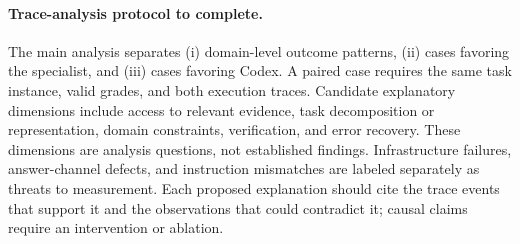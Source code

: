 \paragraph{Trace-analysis protocol to complete.}
The main analysis separates (i) domain-level outcome patterns, (ii) cases favoring the
specialist, and (iii) cases favoring Codex. A paired case requires the same task instance,
valid grades, and both execution traces. Candidate explanatory dimensions include access to
relevant evidence, task decomposition or representation, domain constraints, verification,
and error recovery. These dimensions are analysis questions, not established findings.
Infrastructure failures, answer-channel defects, and instruction mismatches are labeled
separately as threats to measurement. Each proposed explanation should cite the trace events
that support it and the observations that could contradict it; causal claims require an
intervention or ablation. 
